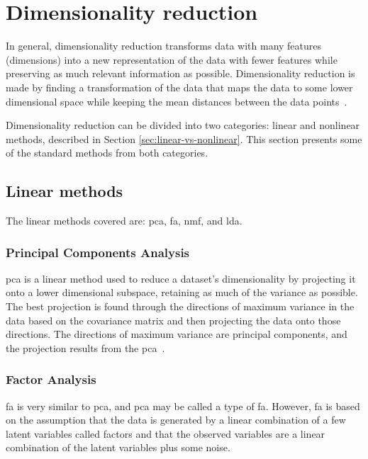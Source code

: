 \section{Dimensionality reduction}\label{sec:dimensionality-reduction}
In general, dimensionality reduction transforms data with many features (dimensions) into a new representation of the data with fewer features while preserving as much relevant information as possible. Dimensionality reduction is made by finding a transformation of the data that maps the data to some lower dimensional space while keeping the mean distances between the data points~\cite{dimensionality-reduction-comparative-review}.

Dimensionality reduction can be divided into two categories: linear and nonlinear methods, described in Section \ref{sec:linear-vs-nonlinear}. This section presents some of the standard methods from both categories.



\subsection{Linear methods}\label{subsec:linear-methods}
The linear methods covered are: \gls{pca}, \gls{fa}, \gls{nmf}, and \gls{lda}.


\subsubsection{Principal Components Analysis}\label{subsubsec:principal-components-analysis}
\gls{pca} is a linear method used to reduce a dataset's dimensionality by projecting it onto a lower dimensional subspace, retaining as much of the variance as possible. The best projection is found through the directions of maximum variance in the data based on the covariance matrix and then projecting the data onto those directions. The directions of maximum variance are principal components, and the projection results from the \gls{pca}~\cite{dimensionality-reduction-comparative-review}.


\subsubsection{Factor Analysis}\label{subsubsec:factor-analysis}
\gls{fa} is very similar to \gls{pca}, and \gls{pca} may be called a type of \gls{fa}. However, \gls{fa} is based on the assumption that the data is generated by a linear combination of a few latent variables called factors and that the observed variables are a linear combination of the latent variables plus some noise.

